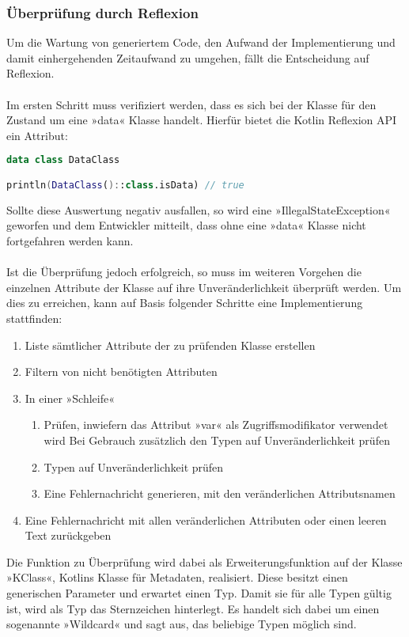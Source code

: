 \subsubsection{Überprüfung durch Reflexion}
Um die Wartung von generiertem Code, den Aufwand der Implementierung und damit einhergehenden Zeitaufwand zu umgehen, fällt die Entscheidung auf Reflexion. 
\\\\
Im ersten Schritt muss verifiziert werden, dass es sich bei der Klasse für den Zustand um eine »data« Klasse handelt. Hierfür bietet die Kotlin Reflexion API ein Attribut:
\begin{lstlisting}[caption={Kotlin »isData« Attribut}, label={lst:data-class}, language=Kotlin]
data class DataClass

println(DataClass()::class.isData) // true
\end{lstlisting}
\bigskip
Sollte diese Auswertung negativ ausfallen, so wird eine »IllegalStateException« geworfen und dem Entwickler mitteilt, dass ohne eine »data« Klasse nicht fortgefahren werden kann.
\\\\ 
Ist die Überprüfung jedoch erfolgreich, so muss im weiteren Vorgehen die einzelnen Attribute der Klasse auf ihre Unveränderlichkeit überprüft werden. Um dies zu erreichen, kann auf Basis folgender Schritte eine Implementierung stattfinden:
\begin{enumerate}[label*=\arabic*.]
	\item Liste sämtlicher Attribute der zu prüfenden Klasse erstellen
	\item Filtern von nicht benötigten Attributen
	\item In einer »Schleife« 
	\begin{enumerate}[label*=\arabic*.]
		\item Prüfen, inwiefern das Attribut »var« als Zugriffsmodifikator verwendet wird
			\subitem Bei Gebrauch zusätzlich den Typen auf Unveränderlichkeit prüfen
		\item Typen auf Unveränderlichkeit prüfen
		\item Eine Fehlernachricht generieren, mit den veränderlichen Attributsnamen
	\end{enumerate}
	\item Eine Fehlernachricht mit allen veränderlichen Attributen oder einen leeren Text zurückgeben
\end{enumerate}
Die Funktion zu Überprüfung wird dabei als Erweiterungsfunktion auf der Klasse »KClass«, Kotlins Klasse für Metadaten, realisiert. Diese besitzt einen generischen Parameter und erwartet einen Typ. Damit sie für alle Typen gültig ist, wird als Typ das Sternzeichen hinterlegt. Es handelt sich dabei um einen sogenannte »Wildcard« und sagt aus, das beliebige Typen möglich sind.
